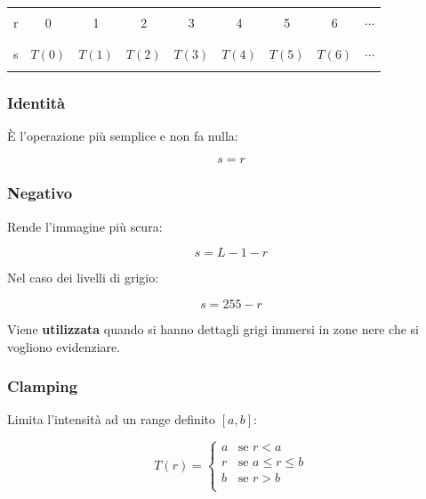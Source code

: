 \documentclass[a4paper]{article}
\begin{document}
	\begin{center}
		\begin{tabular}{|c|c|c|c|c|c|c|c|c|}
			\hline
			&&&&&&&& \\
			r & 0 & 1 & 2 & 3 & 4 & 5 & 6 & $\cdots$ \\
			&&&&&&&& \\
			\hline
			&&&&&&&& \\
			s & $T\left(0\right)$ & $T\left(1\right)$ & $T\left(2\right)$ & $T\left(3\right)$ & $T\left(4\right)$ & $T\left(5\right)$ & $T\left(6\right)$ & $\cdots$ \\
			&&&&&&&& \\
			\hline
		\end{tabular}
	\end{center}

	\newpage
	
	\subsubsection{Identità}
	
	È l'operazione più semplice e non fa nulla:
	
	\begin{equation*}
		s = r
	\end{equation*}

	\subsubsection{Negativo}
	
	Rende l'immagine più scura:
	
	\begin{equation*}
		s = L - 1 - r
	\end{equation*}

	\noindent
	Nel caso dei livelli di grigio:
	
	\begin{equation*}
		s = 255 - r
	\end{equation*}

	\noindent
	Viene \textbf{utilizzata} quando si hanno dettagli grigi immersi in zone nere che si vogliono evidenziare.

	\subsubsection{Clamping}
	
	Limita l'intensità ad un range definito $\left[a,b\right]$:
	
	\begin{equation*}
		T\left(r\right) = \begin{cases}
			a & \text{se } r < a \\
			r & \text{se } a \le r \le b \\
			b & \text{se } r > b \\
		\end{cases}
	\end{equation*}
\end{document}
